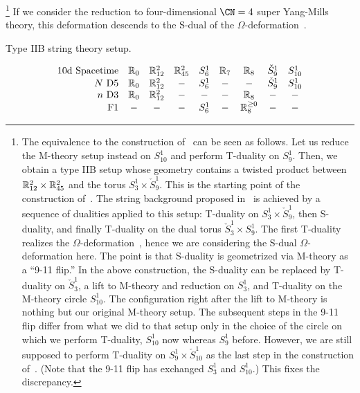 \footnote{The equivalence to the construction
  of~\cite{Costello:2018txb} can be seen as follows.  Let us reduce
  the M-theory setup instead on $S^1_{10}$ and perform T-duality on
  $S^1_9$.  Then, we obtain a type IIB setup whose geometry contains a
  twisted product between $\mathbb{R}^2_{12} \times \mathbb{R}^2_{45}$ and the torus
  $S^1_3 \times \check S^1_9$.  This is the starting point of the
  construction of~\cite{Costello:2018txb}.  The string background
  proposed in~\cite{Costello:2018txb} is achieved by a sequence of
  dualities applied to this setup: T-duality on
  $S^1_3 \times \check S^1_9$, then S-duality, and finally T-duality
  on the dual torus $\check S^1_3 \times S^1_9$.  The first T-duality
  realizes the $\Omega$-deformation~\cite{Hellerman:2011mv,Hellerman:2012zf,Orlando:2013yea}, hence we
  are considering the S-dual $\Omega$-deformation here.  The point is
  that S-duality is geometrized via M-theory as a ``9-11 flip.''  In
  the above construction, the S-duality can be replaced by T-duality
  on $\check S^1_3$, a lift to M-theory and reduction on $S^1_3$, and
  T-duality on the M-theory circle $S^1_{10}$.  The configuration
  right after the lift to M-theory is nothing but our original
  M-theory setup.  The subsequent steps in the 9-11 flip differ from
  what we did to that setup only in the choice of the circle on which
  we perform T-duality, $S^1_{10}$ now whereas $S^1_9$ before.
  However, we are still supposed to perform T-duality on
  $S^1_9 \times \check S^1_{10}$ as the last step in the construction
  of~\cite{Costello:2018txb}.  (Note that the 9-11 flip has exchanged
  $S^1_3$ and $S^1_{10}$.)  This fixes the discrepancy.}
%
If we consider the reduction to four-dimensional $\CN = 4$ super
Yang-Mills theory, this deformation descends to the S-dual of the
$\Omega$-deformation~\cite{Nekrasov:2002qd}.


\begin{table}
  \caption{Type IIB string theory setup.}
  \vspace{-0.5cm}
    \centering
    \begin{equation*}
      \begin{array}{rcccccccc}
        \text{10d Spacetime} & \mathbb{R}_0 & \mathbb{R}_{12}^2  & \mathbb{R}_{45}^2 & S_6^1 & \mathbb{R}_{7} & \mathbb{R}_{8} & \check{S}^1_9 & S_{10}^1 \\
        N \text{ D5}         & \mathbb{R}_0 & \mathbb{R}_{12}^2  & - & S_6^1 & - & - & \check{S}^1_9 & S_{10}^1 \\
        n \text{ D3}         & \mathbb{R}_0 & \mathbb{R}_{12}^2  & - & - & - & \mathbb{R}_8 & - & - \\
        \text{F1}            & - & -  & - & S_6^1 & - & \mathbb{R}_8^{\geq 0} & - & -
      \end{array}
    \end{equation*}
\label{tab:IIB-branes}
\end{table}



